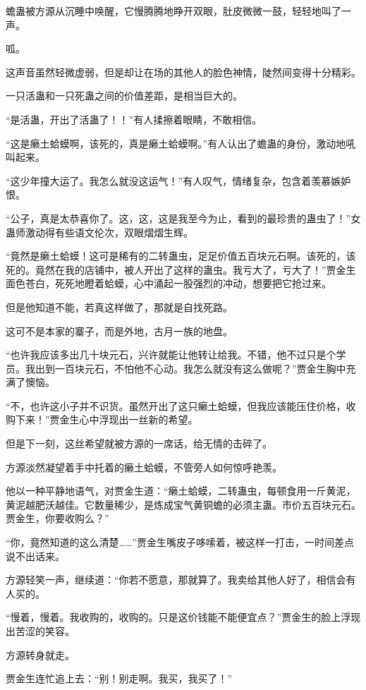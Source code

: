 \begin{this_body}
蟾蛊被方源从沉睡中唤醒，它慢腾腾地睁开双眼，肚皮微微一鼓，轻轻地叫了一声。

呱。

这声音虽然轻微虚弱，但是却让在场的其他人的脸色神情，陡然间变得十分精彩。

一只活蛊和一只死蛊之间的价值差距，是相当巨大的。

“是活蛊，开出了活蛊了！！”有人揉擦着眼睛，不敢相信。

“这是癞土蛤蟆啊，该死的，真是癞土蛤蟆啊。”有人认出了蟾蛊的身份，激动地吼叫起来。

“这少年撞大运了。我怎么就没这运气！”有人叹气，情绪复杂，包含着羡慕嫉妒恨。

“公子，真是太恭喜你了。这，这，这是我至今为止，看到的最珍贵的蛊虫了！”女蛊师激动得有些语文伦次，双眼熠熠生辉。

“竟然是癞土蛤蟆！这可是稀有的二转蛊虫，足足价值五百块元石啊。该死的，该死的。竟然在我的店铺中，被人开出了这样的蛊虫。我亏大了，亏大了！”贾金生面色苍白，死死地瞪着蛤蟆，心中涌起一股强烈的冲动，想要把它抢过来。

但是他知道不能，若真这样做了，那就是自找死路。

这可不是本家的寨子，而是外地，古月一族的地盘。

“也许我应该多出几十块元石，兴许就能让他转让给我。不错，他不过只是个学员。我出到一百块元石，不怕他不心动。我怎么就没有这么做呢？”贾金生胸中充满了懊恼。

“不，也许这小子并不识货。虽然开出了这只癞土蛤蟆，但我应该能压住价格，收购下来！”贾金生心中浮现出一丝新的希望。

但是下一刻，这丝希望就被方源的一席话，给无情的击碎了。

方源淡然凝望着手中托着的癞土蛤蟆，不管旁人如何惊呼艳羡。

他以一种平静地语气，对贾金生道：“癞土蛤蟆，二转蛊虫，每顿食用一斤黄泥，黄泥越肥沃越佳。它数量稀少，是炼成宝气黄铜蟾的必须主蛊。市价五百块元石。贾金生，你要收购么？”

“你，竟然知道的这么清楚……”贾金生嘴皮子哆嗦着，被这样一打击，一时间差点说不出话来。

方源轻笑一声，继续道：“你若不愿意，那就算了。我卖给其他人好了，相信会有人买的。

“慢着，慢着。我收购的，收购的。只是这价钱能不能便宜点？”贾金生的脸上浮现出苦涩的笑容。

方源转身就走。

贾金生连忙追上去：“别！别走啊。我买，我买了！”


\end{this_body}
